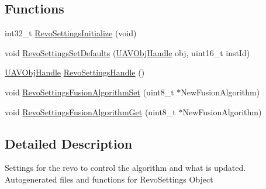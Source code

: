 \subsection*{\-Functions}
\begin{DoxyCompactItemize}
\item 
int32\-\_\-t \hyperlink{group___revo_settings_ga75bf144fc0ce788191d1690ab1bd2624}{\-Revo\-Settings\-Initialize} (void)
\item 
void \hyperlink{group___revo_settings_ga7c32c4b713150f0921c5968ae5b23cf7}{\-Revo\-Settings\-Set\-Defaults} (\hyperlink{targets_2_u_a_v_objects_2inc_2uavobjectmanager_8h_a279053e22be53ce9f895043aaeb91e3b}{\-U\-A\-V\-Obj\-Handle} obj, uint16\-\_\-t inst\-Id)
\item 
\hyperlink{targets_2_u_a_v_objects_2inc_2uavobjectmanager_8h_a279053e22be53ce9f895043aaeb91e3b}{\-U\-A\-V\-Obj\-Handle} \hyperlink{group___revo_settings_ga099a79cd2cac0dd1291716dc02bc54bb}{\-Revo\-Settings\-Handle} ()
\item 
void \hyperlink{group___revo_settings_ga232e92040a61f55e0b1b32e74e198f3e}{\-Revo\-Settings\-Fusion\-Algorithm\-Set} (uint8\-\_\-t $\ast$\-New\-Fusion\-Algorithm)
\item 
void \hyperlink{group___revo_settings_ga77008e7350503fca2e0d5bdac8fb1b6f}{\-Revo\-Settings\-Fusion\-Algorithm\-Get} (uint8\-\_\-t $\ast$\-New\-Fusion\-Algorithm)
\end{DoxyCompactItemize}


\subsection{\-Detailed \-Description}
\-Settings for the revo to control the algorithm and what is updated. \-Autogenerated files and functions for \-Revo\-Settings \-Object 

